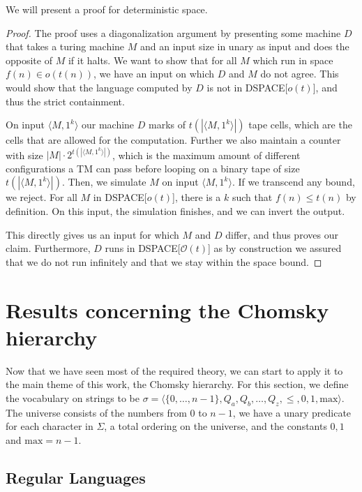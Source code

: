 We will present a proof for deterministic space.
\begin{proof}
    The proof uses a diagonalization argument by presenting some machine $D$ that takes a turing machine $M$ and an input size in unary as input and does the opposite of $M$ if it halts.
    We want to show that for all $M$ which run in space $f(n) \in o(t(n))$, we have an input on which $D$ and $M$ do not agree.
    This would show that the language computed by $D$ is not in DSPACE[$o(t)$], and thus the strict containment.

    On input $\langle M, 1^{k} \rangle$ our machine $D$ marks of $t(|\langle M, 1^{k} \rangle|)$ tape cells, which are the cells that are allowed for the computation.
    Further we also maintain a counter with size $|M|\cdot 2^{t(|\langle M, 1^{k} \rangle|)}$, which is the maximum amount of different configurations a TM can pass before looping on a binary tape of size $t(|\langle M, 1^{k} \rangle|)$.
    Then, we simulate $M$ on input $\langle M, 1^{k} \rangle$.
    If we transcend any bound, we reject.
    For all $M$ in DSPACE[$o(t)$], there is a $k$ such that $f(n) \leq t(n)$ by definition.
    On this input, the simulation finishes, and we can invert the output.

    This directly gives us an input for which $M$ and $D$ differ, and thus proves our claim.
    Furthermore, $D$ runs in DSPACE[$\mathcal{O}(t)$] as by construction we assured that we do not run infinitely and that we stay within the space bound.
\end{proof}


\section{Results concerning the Chomsky hierarchy}\label{sec:results-concerning-the-chomsky-hierarchy}

Now that we have seen most of the required theory, we can start to apply it to the main theme of this work, the Chomsky hierarchy.
For this section, we define the vocabulary on strings to be $\sigma = \langle \{0, \dots, n - 1\}, Q_a, Q_b, \dots, Q_z, \leq , 0, 1, \text{max} \rangle$.
The universe consists of the numbers from $0$ to $n - 1$, we have a unary predicate for each character in $\Sigma$, a total ordering on the universe, and the constants $0, 1$ and $\text{max} = n - 1$.

\subsection{Regular Languages}\label{subsec:des-regular-languages}

